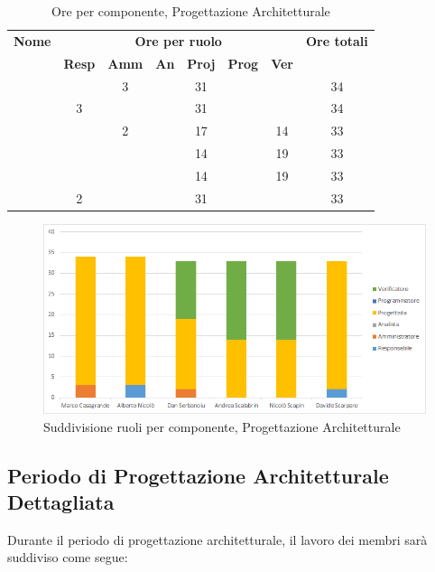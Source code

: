 \begin{table}[H]
	\begin{center}
		\begin{tabular}{|c|c|c|c|c|c|c|c|}
			\hline
			\textbf{Nome} & \multicolumn{6}{c|}{\textbf{Ore per ruolo}} & \textbf{Ore totali} \\\cline{2-7}
			& \textbf{Resp} & \textbf{Amm} & \textbf{An} & \textbf{Proj} & \textbf{Prog} & \textbf{Ver} & \\
			\hline
			\MC			&		&	3	&		&	31	&		&		&   34	\\
			\hline
			\AN			&	3	&		&		&	31	&		&		& 	34	\\
			\hline
			\DAN		&		&	2	&		&	17	&		&	14	&	33	\\
			\hline
			\AS			&		&	 	&	 	&	14	&	 	& 	19	&	33	\\
			\hline
			\NS 		&		&		&		&	14	&		& 	19	&	33	\\
			\hline
			\DS			& 	2	&		&		&	31	&		&		&	33	\\
			\hline
		\end{tabular}
	\end{center}
	\caption{Ore per componente, Progettazione Architetturale}
\end{table}

\begin{figure}[H]
	\centering
	\includegraphics[scale=0.6]{img/6-2.png}
	\caption{Suddivisione ruoli per componente, Progettazione Architetturale}
\end{figure}

\newpage
\subsection{Periodo di Progettazione Architetturale Dettagliata}
Durante il periodo di progettazione architetturale, il lavoro dei membri sarà suddiviso come segue:

